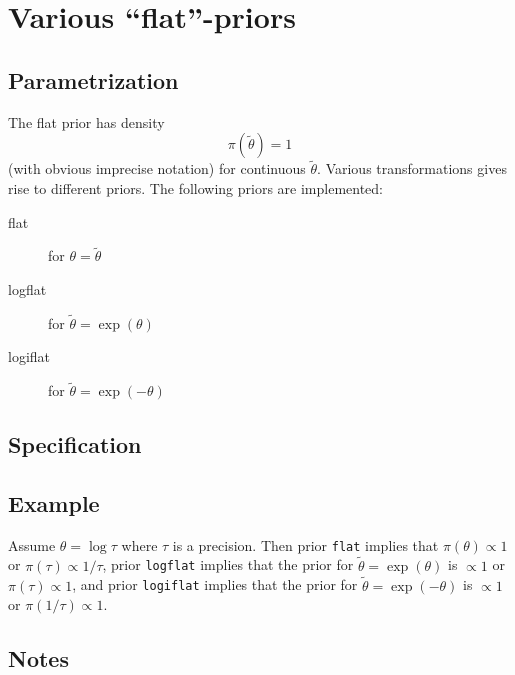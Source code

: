 \documentclass[a4paper,11pt]{article}
\begin{document}
\section*{Various ``flat''-priors}

\subsection*{Parametrization}
The flat prior has density
\begin{equation}
    \pi(\widetilde{\theta})= 1
\end{equation}
(with obvious imprecise notation) for continuous $\widetilde{\theta}$.
Various transformations gives rise to different priors. The following
priors are implemented:
\begin{description}
\item[flat]  for $\theta = \widetilde{\theta}$
\item[logflat] for $\widetilde{\theta} = \exp(\theta)$
\item[logiflat] for $\widetilde{\theta} = \exp(-\theta)$
\end{description}
 
\subsection*{Specification}

\subsection*{Example}

Assume $\theta = \log \tau$ where $\tau$ is a precision. Then prior
\texttt{flat} implies that $\pi(\theta) \propto 1$ or $\pi(\tau)
\propto 1/\tau$, prior \texttt{logflat} implies that the prior for
$\widetilde{\theta} = \exp(\theta)$ is $\propto 1$ or $\pi(\tau)
\propto 1$, and prior \texttt{logiflat} implies that the prior for 
$\widetilde{\theta} = \exp(-\theta)$ is $\propto 1$ or $\pi(1/\tau)
\propto 1$.

\subsection*{Notes}
\end{document}
